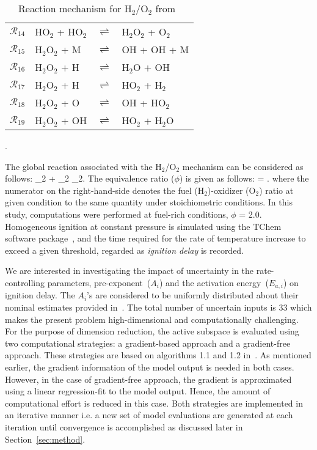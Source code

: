 \begin{table}[htbp]
\begin{center}
\begin{tabular}{llll}
$\mathcal{R}_{14}$ & HO$_2$ + HO$_2$ & $\rightleftharpoons$ & H$_2$O$_2$ + O$_2$ \\
$\mathcal{R}_{15}$ & H$_2$O$_2$ + M  & $\rightleftharpoons$ & OH + OH + M \\
$\mathcal{R}_{16}$ & H$_2$O$_2$ + H  & $\rightleftharpoons$ & H$_2$O + OH \\
$\mathcal{R}_{17}$ & H$_2$O$_2$ + H  & $\rightleftharpoons$ & HO$_2$ + H$_2$ \\
$\mathcal{R}_{18}$ & H$_2$O$_2$ + O  & $\rightleftharpoons$ & OH + HO$_2$ \\
$\mathcal{R}_{19}$ & H$_2$O$_2$ + OH & $\rightleftharpoons$ & HO$_2$ + H$_2$O \\
\bottomrule
\end{tabular}
\end{center}
\caption{Reaction mechanism for H$_2$/O$_2$ from~\cite{Yetter:1991}}.
\label{tab:kinetics}
\end{table}

The global reaction associated with the H$_2$/O$_2$ mechanism can
be considered as follows:
_2 + _2 _2.
\label{eq:global}
\ee 
The equivalence ratio ($\phi$) is given as follows:
%
\be
\phi = .
\label{eq:phi}
\ee
%
where the numerator on the right-hand-side denotes the fuel (H$_2$)-oxidizer
(O$_2$) ratio at given condition to the same quantity under stoichiometric
conditions. In this study, computations were performed at fuel-rich conditions,
$\phi$ = 2.0. Homogeneous ignition at constant pressure is simulated using the
TChem software package~\cite{Safta:2011}, and the time required for the rate of
temperature increase to exceed a given threshold, regarded as \emph{ignition delay}
is recorded. 

We are interested in investigating the impact of uncertainty in the
rate-controlling parameters, pre-exponent~($A_i$) and the activation
energy~($E_{a,i}$) on ignition delay. The $A_i$'s are considered to be
uniformly distributed about their nominal estimates provided
in~\cite{Yetter:1991}.  The total number of uncertain inputs is 33 which makes
the present problem high-dimensional and computationally challenging. 
For the purpose of dimension reduction, the active subspace is evaluated using
two computational strategies: a gradient-based approach and  
a gradient-free approach. These strategies are based on algorithms 1.1 and 1.2 
in~\cite{Constantine:2015}. As mentioned earlier, the gradient information of the model
output is needed in both cases. However, in the case of gradient-free approach,
the gradient is approximated using a linear regression-fit to the model output.
Hence, the amount of computational effort is reduced in this case. Both strategies
are implemented in an iterative manner i.e. a new set of model evaluations are
generated at each iteration until convergence is accomplished as discussed
later in Section~\ref{sec:method}. 

